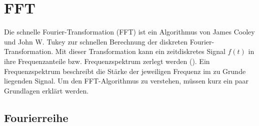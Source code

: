 





\section{FFT}

Die schnelle Fourier-Transformation (FFT) ist ein Algorithmus von  James Cooley und John W. Tukey zur schnellen Berechnung der diskreten Fourier-Transformation. Mit dieser Transformation kann ein zeitdiskretes Signal $f(t)$ in ihre Frequenzanteile bzw. Frequenzspektrum zerlegt werden (\cite[S.14]{hejobu 84}). Ein Frequenzspektrum beschreibt die Stärke der jeweiligen Frequenz im zu Grunde liegenden Signal. Um den FFT-Algorithmus zu verstehen, müssen kurz ein paar Grundlagen erklärt werden.


\subsection{Fourierreihe}

